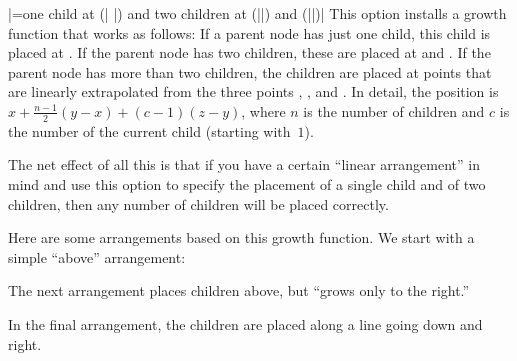 \begin{itemize}
  |=one child at (|%
  |) and two children at (||) and (||)|
  This option installs a growth function that works as follows: If a
  parent node has just one child, this child is placed at . If
  the parent node has two children, these are placed at  and
  . If the parent node has more than two children, the
  children are placed at points that are linearly extrapolated from
  the three points , , and . In detail, the
  position is $x + \frac{n-1}{2}(y-x) + (c-1)(z-y)$, where $n$ is the
  number of children and $c$ is the number of the current child
  (starting with~$1$).

  The net effect of all this is that if you have a certain ``linear
  arrangement'' in mind and use this option to specify the placement
  of a single child and of two children, then any number of children
  will be placed correctly.

  Here are some arrangements based on this growth function. We start
  with a simple ``above'' arrangement:
\begin{codeexample}[]
\end{codeexample}    

  The next arrangement places children above, but ``grows only to the
  right.'' 
\begin{codeexample}[]
\end{codeexample}    

  In the final arrangement, the children are placed along a line going
  down and right.
\begin{codeexample}[]
\end{codeexample}


\end{itemize}
